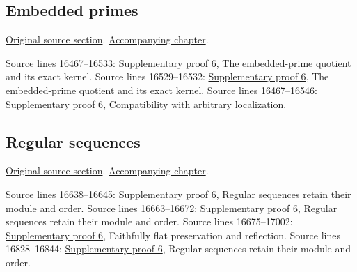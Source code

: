 \subsection{Embedded primes}
\hypertarget{algebra-source-section-embedded-primes}{}
\noindent\href{https://github.com/stacks/stacks-project/blob/a04446e57ec1fbc252a871afcec7752fb2807b14/algebra.tex\#L16445}{Original source section}. \href{algebra.pdf\#nameddest=section-embedded-primes}{Accompanying chapter}.

\begin{AlgebraSourceRoutes}
 Source lines 16467--16533: \hyperlink{algebra_embedded_regular_notes_20260927}{Supplementary proof 6}, The embedded-prime quotient and its exact kernel.
 Source lines 16529--16532: \hyperlink{algebra_embedded_regular_notes_20260927}{Supplementary proof 6}, The embedded-prime quotient and its exact kernel.
 Source lines 16467--16546: \hyperlink{algebra_embedded_regular_notes_20260927}{Supplementary proof 6}, Compatibility with arbitrary localization.
\end{AlgebraSourceRoutes}

\subsection{Regular sequences}
\hypertarget{algebra-source-section-regular-sequences}{}
\noindent\href{https://github.com/stacks/stacks-project/blob/a04446e57ec1fbc252a871afcec7752fb2807b14/algebra.tex\#L16587}{Original source section}. \href{algebra.pdf\#nameddest=section-regular-sequences}{Accompanying chapter}.

\begin{AlgebraSourceRoutes}
 Source lines 16638--16645: \hyperlink{algebra_embedded_regular_notes_20260927}{Supplementary proof 6}, Regular sequences retain their module and order.
 Source lines 16663--16672: \hyperlink{algebra_embedded_regular_notes_20260927}{Supplementary proof 6}, Regular sequences retain their module and order.
 Source lines 16675--17002: \hyperlink{algebra_embedded_regular_notes_20260927}{Supplementary proof 6}, Faithfully flat preservation and reflection.
 Source lines 16828--16844: \hyperlink{algebra_embedded_regular_notes_20260927}{Supplementary proof 6}, Regular sequences retain their module and order.
\end{AlgebraSourceRoutes}

